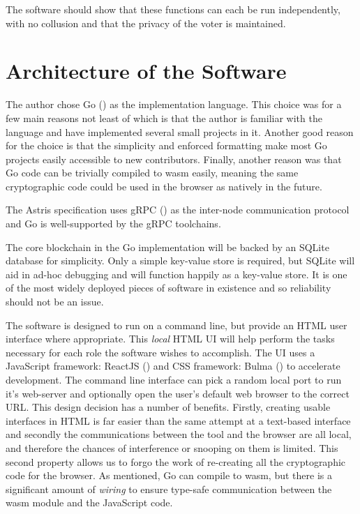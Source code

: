 The software should show that these functions can each be run independently, with no collusion and that the privacy of the voter is maintained.

\section{Architecture of the Software}
\label{ch:sw:architecture}

The author chose Go () as the implementation language. This choice was for a few main reasons not least of which is that the author is familiar with the language and have implemented several small projects in it. Another good reason for the choice is that the simplicity and enforced formatting make most Go projects easily accessible to new contributors. Finally, another reason was that Go code can be trivially compiled to \gls{wasm} easily, meaning the same cryptographic code could be used in the browser as natively in the future.

The Astris specification uses gRPC () as the inter-node communication protocol and Go is well-supported by the gRPC toolchains.

The core blockchain in the Go implementation will be backed by an SQLite database for simplicity. Only a simple key-value store is required, but SQLite will aid in ad-hoc debugging and will function happily as a key-value store. It is one of the most widely deployed pieces of software in existence \cite{MostWidelyDeployed} and so reliability should not be an issue.

The software is designed to run on a command line, but provide an HTML user interface where appropriate. This \emph{local} HTML UI will help perform the tasks necessary for each role the software wishes to accomplish. The UI uses a JavaScript framework: ReactJS () and CSS framework: Bulma () to accelerate development. The command line interface can pick a random local port to run it's web-server and optionally open the user's default web browser to the correct URL. This design decision has a number of benefits. Firstly, creating usable interfaces in HTML is far easier than the same attempt at a text-based interface and secondly the communications between the tool and the browser are all local, and therefore the chances of interference or snooping on them is limited. This second property allows us to forgo the work of re-creating all the cryptographic code for the browser. As mentioned, Go can compile to \gls{wasm}, but there is a significant amount of \emph{wiring} to ensure type-safe communication between the \gls{wasm} module and the JavaScript code.

